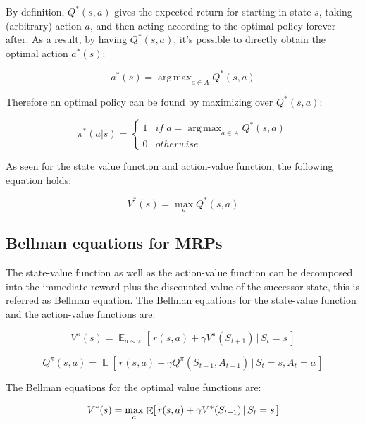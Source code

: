 \documentclass{article}
\DeclareMathOperator*{\E}{\mathbb{E}}
\DeclareMathOperator*{\argmax}{arg\,max}
\begin{document}
By definition, $Q^*(s,a)$ gives the expected return for starting in state $s$, taking (arbitrary) action $a$, and then acting according to the optimal policy forever after. As a result, by having $Q^*(s,a)$, it's possible to directly obtain the optimal action $a^*(s)$:

\begin{equation}
a^*(s) = \argmax_{a \in A} Q^* (s,a)
\end{equation}

Therefore an optimal policy can be found by maximizing over $Q^*(s,a)$:

\begin{equation}
	\pi^*(a|s) = 
	\begin{cases}
		1 & if \; a = \argmax_{a \in A} Q^*(s,a)\\
		0 & otherwise
	\end{cases}
	\label{eq:opt-policy}
\end{equation}

As seen for the state value function and action-value function, the following equation holds:

\begin{equation}
V^*(s) = \max_a Q^* (s,a)
\end{equation}

\subsection{Bellman equations for MRPs}
The state-value function as well as the action-value function can be decomposed into the immediate reward plus the discounted value of the successor state, this is referred as Bellman equation. The Bellman equations for the state-value function and the action-value functions are:


	\begin{equation}
	V^{\pi}(s) = \E_{a \sim \pi} [\, {r(s, a) + \gamma V^{\pi}(S_{t+1}) \,|\, S_t=s} \,]	
	\end{equation}

	\begin{equation}
		Q^{\pi}(s,a) = \E[\, {r(s,a) + \gamma {Q^{\pi}(S_{t+1},A_{t+1})} \,|\, S_t=s, A_t = a} \,]
	\end{equation}

The Bellman equations for the optimal value functions are:


\begin{equation}
	V^{*}(s) = \max_a \, \E [\, {r(s, a) + \gamma V^{*}(S_{t+1}) \,|\, S_t=s} \,] \\
\end{equation}
\end{document}
